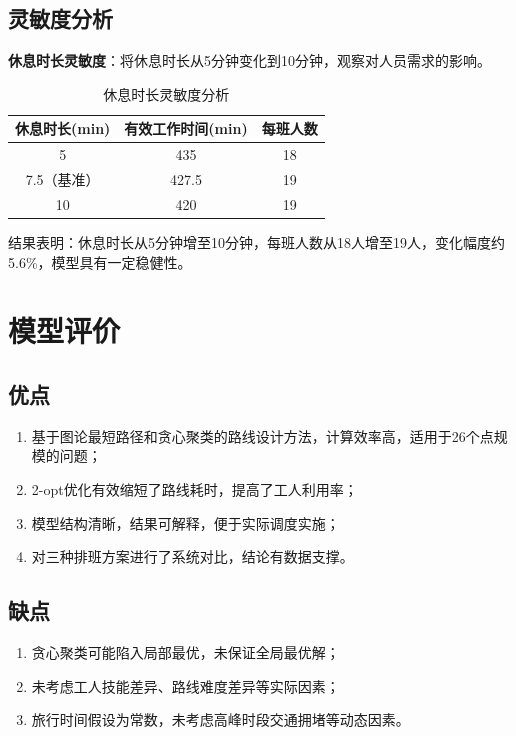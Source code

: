 \documentclass[12pt,a4paper]{article}
\begin{document}
\subsection{灵敏度分析}

\textbf{休息时长灵敏度}：将休息时长从5分钟变化到10分钟，观察对人员需求的影响。

\begin{table}[H]
\centering
\caption{休息时长灵敏度分析}
\label{tab:sensitivity}
\begin{tabular}{ccc}
\toprule
\textbf{休息时长(min)} & \textbf{有效工作时间(min)} & \textbf{每班人数} \\
\midrule
5 & 435 & 18 \\
7.5（基准） & 427.5 & 19 \\
10 & 420 & 19 \\
\bottomrule
\end{tabular}
\end{table}

结果表明：休息时长从5分钟增至10分钟，每班人数从18人增至19人，变化幅度约5.6\%，模型具有一定稳健性。

\section{模型评价}

\subsection{优点}
\begin{enumerate}
    \item 基于图论最短路径和贪心聚类的路线设计方法，计算效率高，适用于26个点规模的问题；
    \item 2-opt优化有效缩短了路线耗时，提高了工人利用率；
    \item 模型结构清晰，结果可解释，便于实际调度实施；
    \item 对三种排班方案进行了系统对比，结论有数据支撑。
\end{enumerate}

\subsection{缺点}
\begin{enumerate}
    \item 贪心聚类可能陷入局部最优，未保证全局最优解；
    \item 未考虑工人技能差异、路线难度差异等实际因素；
    \item 旅行时间假设为常数，未考虑高峰时段交通拥堵等动态因素。
\end{enumerate}
\end{document}
